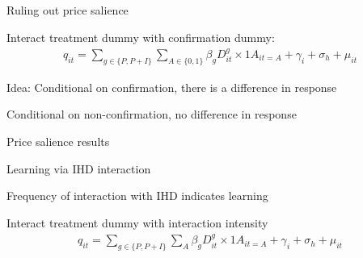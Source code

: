 \documentclass[aspectratio=169]{beamer}
\newenvironment{wideitemize}{\itemize\addtolength{\itemsep}{10pt}}{\enditemize}
\begin{document}
\begin{frame}{Ruling out price salience}
    \begin{wideitemize}
        \item Interact treatment dummy with confirmation dummy:
        \begin{align*}
            q _ { i t } = \sum _ { g \in \{ P , P + I \} } \sum_{A \in \{ 0,1 \}} \beta _ { g } D _ { i t } ^ { g } \times 1 A _ { i t = A }  + \gamma _ { i } + \sigma _ { h } + \mu _ { i t }
        \end{align*}
        \item Idea: Conditional on confirmation, there is a difference in response
        \item Conditional on non-confirmation, no difference in response
    \end{wideitemize}
\end{frame}

\begin{frame}{Price salience results}
    \center
\end{frame}

\begin{frame}{Learning via IHD interaction}
    \begin{wideitemize}
        \item Frequency of interaction with IHD indicates learning
        \item Interact treatment dummy with interaction intensity
        \begin{align*}
            q _ { i t } = \sum _ { g \in \{ P , P + I \} } \sum_{A} \beta _ { g } D _ { i t } ^ { g } \times 1 A _ { i t = A }  + \gamma _ { i } + \sigma _ { h } + \mu _ { i t }
        \end{align*}
    \end{wideitemize}
\end{frame}
\end{document}

